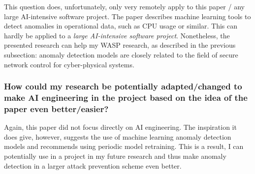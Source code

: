 \documentclass[11pt]{article}
\begin{document}
This question does, unfortunately, only very remotely apply to this paper / any large AI-intensive software project.
The paper describes machine learning tools to detect anomalies in operational data, such as CPU usage or similar. 
This can hardly be applied to a \textit{large AI-intensive software project}. 
Nonetheless, the presented research can help my WASP research, as described in the previous subsection: anomaly detection models are closely related to the field of secure network control for cyber-physical systems.

\subsubsection{How could my research be potentially adapted/changed to make AI engineering in the project based on the idea of the paper even better/easier?}

Again, this paper did not focus directly on AI engineering. 
The inspiration it does give, however, suggests the use of machine learning anomaly detection models and recommends using periodic model retraining. 
This is a result, I can potentially use in a project in my future research and thus make anomaly detection in a larger attack prevention scheme even better. 





\end{document}
